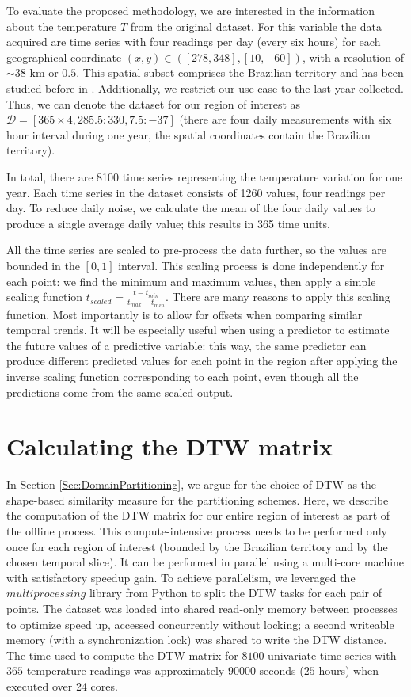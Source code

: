 To evaluate the proposed methodology, we are interested in the information about the temperature $T$ from the original dataset. For this variable the data acquired are time series with four readings per day (every six hours) for each geographical coordinate $(x,y)\in ([278, 348], [10,-60])$, with a resolution of $\sim 38$ km or $0.5$\textdegree. This spatial subset comprises the Brazilian territory and has been studied before in \cite{Souto2018}. Additionally, we restrict our use case to the last year collected. Thus, we can denote the dataset for our region of interest as $\mathcal{D} = [ 365\times 4, 285.5:330, 7.5:-37]$ (there are four daily measurements with six hour interval during one year, the spatial coordinates contain the Brazilian territory). 

In total, there are 8100 time series representing the temperature variation for one year. Each time series in the dataset consists of 1260 values, four readings per day. To reduce daily noise, we calculate the mean of the four daily values to produce a single average daily value; this results in 365 time units. 

All the time series are scaled to pre-process the data further, so the values are bounded in the $[0, 1]$ interval. This scaling process is done independently for each point: we find the minimum and maximum values, then apply a simple scaling function $ t_{scaled} = \frac{t-t_{min}}{t_{max}-t_{min}}$. There are many reasons to apply this scaling function. Most importantly is to allow for offsets when comparing similar temporal trends. It will be especially useful when using a predictor to estimate the future values of a predictive variable: this way, the same predictor can produce different predicted values for each point in the region after applying the inverse scaling function corresponding to each point, even though all the predictions come from the same scaled output.

\section{Calculating the DTW matrix}
\label{Sec:Calculating_DTW}

In Section \ref{Sec:DomainPartitioning}, we argue for the choice of DTW as the shape-based similarity measure for the partitioning schemes. Here, we describe the computation of the DTW matrix for our entire region of interest as part of the offline process. This compute-intensive process needs to be performed only once for each region of interest (bounded by the Brazilian territory and by the chosen temporal slice). It can be performed in parallel using a multi-core machine with satisfactory speedup gain. To achieve parallelism, we leveraged the $multiprocessing$ library from Python to split the DTW tasks for each pair of points. The dataset was loaded into shared read-only memory between processes to optimize speed up, accessed concurrently without locking; a second writeable memory (with a synchronization lock) was shared to write the DTW distance. The time used to compute the DTW matrix for $8100$ univariate time series with $365$ temperature readings was approximately $90000$ seconds ($25$ hours) when executed over 24 cores.

